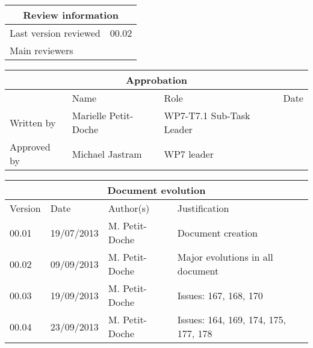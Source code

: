 \documentclass{template/openetcs_report}
\begin{document}
\begin{tabular}{|p{4.4cm}|p{8.7cm}|}
\hline
\multicolumn{2}{|c|}{Review information} \\
\hline
Last version reviewed & 00.02 \\
\hline
Main reviewers &  \\
 
\hline
\end{tabular}

\begin{tabular}{|p{2.2cm}|p{4cm}|p{4cm}|p{2cm}|}
\hline
\multicolumn{4}{|c|}{Approbation} \\
\hline
  &  Name & Role & Date   \\
\hline  
Written by    &  Marielle Petit-Doche & WP7-T7.1 Sub-Task Leader  & \\
\hline
Approved by & Michael Jastram & WP7 leader & \\
\hline
\end{tabular}

\begin{tabular}{|p{2.2cm}|p{2cm}|p{3cm}|p{5cm}|}
\hline
\multicolumn{4}{|c|}{Document evolution} \\
\hline
Version &  Date & Author(s) & Justification  \\
\hline  
00.01 & 19/07/2013 & M. Petit-Doche &  Document creation  \\
00.02 & 09/09/2013 & M. Petit-Doche &  Major evolutions in all document  \\
00.03 & 19/09/2013 & M. Petit-Doche &  Issues: 167, 168, 170  \\
00.04 & 23/09/2013 & M. Petit-Doche &  Issues: 164, 169, 174, 175, 177, 178  \\
\hline  
\end{tabular}



\newcommand{\tbd}{\colorbox{cyan}{\%\%To Be Defined\%\%}}
\newcommand{\tbc}{\colorbox{cyan}{\%\%To Be Confirmed\%\%}}
\newcommand{\todo}[1]{\colorbox{cyan}{\%\%{#1}\%\%}}
\newlength{\origindent}

\newenvironment{issue}{
        \begin{quote}
        \begin{itshape}Open Issue.
}{
        \end{itshape}
        \end{quote}
}
\end{document}

